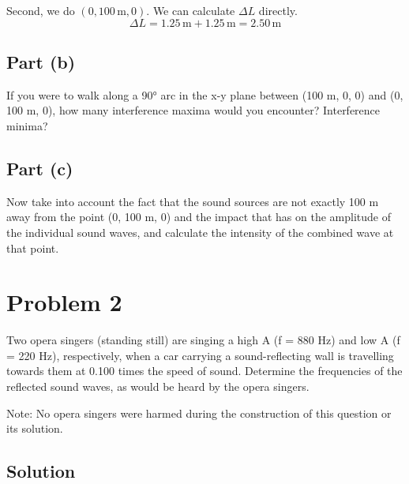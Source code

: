 \documentclass[12pt]{article}
\begin{document}
                Second, we do $(0, 100\,\unit{\meter}, 0)$. 
                We can calculate $\Delta L$ directly.
                \begin{equation}
                    \Delta L = 1.25\,\unit{\meter} + 1.25\,\unit{\meter} = 2.50\,\unit{\meter}  
                \end{equation}

        \subsection{Part (b)}
            If you were to walk along a 90\unit{\degree} arc in the x-y plane between (100 m, 0, 0) and (0, 100 m, 0), how many interference maxima would you encounter?
            Interference minima?

        \subsection{Part (c)}
            Now take into account the fact that the sound sources are not exactly 100 m away from the point (0, 100 m, 0) and the impact that has on the amplitude of the individual sound waves, and calculate the intensity of the combined wave at that point.

    \section{Problem 2}
        Two opera singers (standing still) are singing a high A (f = 880 Hz) and low A (f = 220 Hz), respectively, when a car carrying a sound-reﬂecting wall is travelling towards them at 0.100 times the speed of sound. 
        Determine the frequencies of the reﬂected sound waves, as would be heard by the opera singers.
        
        Note: No opera singers were harmed during the construction of this question or its solution.

        \subsection{Solution}
\end{document}
